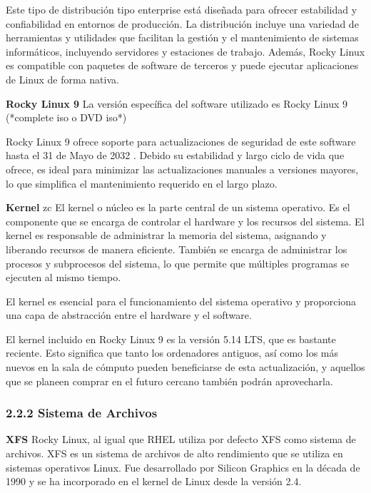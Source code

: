 \begin{doublespace}
\begin{multicols}{2}
    Este tipo de distribución tipo enterprise está diseñada para ofrecer estabilidad y confiabilidad en entornos de producción. La distribución incluye una variedad de herramientas y utilidades que facilitan la gestión y el mantenimiento de sistemas informáticos, incluyendo servidores y estaciones de trabajo. Además, Rocky Linux es compatible con paquetes de software de terceros y puede ejecutar aplicaciones de Linux de forma nativa. \cite{RL-1}

    \textbf{Rocky Linux 9}
    \newline
    La versión específica del software utilizado es Rocky Linux 9 (*complete iso o DVD iso*) \cite{RL9-download-1} \cite{RL9-release-1}  \cite{RHEL-release-1} 

    Rocky Linux 9 ofrece soporte para actualizaciones de seguridad de este software hasta el 31 de Mayo de 2032 \cite{RL9-EOL-1}. Debido su estabilidad y largo ciclo de vida que ofrece, es ideal para minimizar las actualizaciones manuales a versiones mayores, lo que simplifica el mantenimiento requerido en el largo plazo.

    \textbf{Kernel}
zc  
    El kernel o núcleo es la parte central de un sistema operativo. Es el componente que se encarga de controlar el hardware y los recursos del sistema. El kernel es responsable de administrar la memoria del sistema, asignando y liberando recursos de manera eficiente. También se encarga de administrar los procesos y subprocesos del sistema, lo que permite que múltiples programas se ejecuten al mismo tiempo.

    El kernel es esencial para el funcionamiento del sistema operativo y proporciona una capa de abstracción entre el hardware y el software.  \cite{RHEL-kernel-1}

    El kernel incluido en Rocky Linux 9 es la versión 5.14 LTS, que es bastante reciente. Esto significa que tanto los ordenadores antiguos, así como los más nuevos en la sala de cómputo pueden beneficiarse de esta actualización, y aquellos que se planeen comprar en el futuro cercano también podrán aprovecharla. \cite{RL9-release-1}
    \newline

    \subsubsection{2.2.2 Sistema de Archivos}

    \textbf{XFS}
    \newline
    Rocky Linux, al igual que RHEL utiliza por defecto XFS como sistema de archivos. XFS es un sistema de archivos de alto rendimiento que se utiliza en sistemas operativos Linux. Fue desarrollado por Silicon Graphics en la década de 1990 y se ha incorporado en el kernel de Linux desde la versión 2.4.


\end{multicols}
\end{doublespace}
